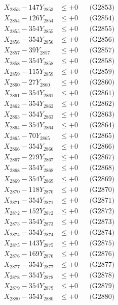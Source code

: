 \documentclass[a4paper,10pt]{article}
\begin{document}
{\begin{align}
X_{2853} - 147Y_{2853} &\leq +0 && \text{(G2853)} \\
X_{2854} - 126Y_{2854} &\leq +0 && \text{(G2854)} \\
X_{2855} - 354Y_{2855} &\leq +0 && \text{(G2855)} \\
X_{2856} - 354Y_{2856} &\leq +0 && \text{(G2856)} \\
X_{2857} - 39Y_{2857} &\leq +0 && \text{(G2857)} \\
X_{2858} - 354Y_{2858} &\leq +0 && \text{(G2858)} \\
X_{2859} - 115Y_{2859} &\leq +0 && \text{(G2859)} \\
X_{2860} - 27Y_{2860} &\leq +0 && \text{(G2860)} \\
\allowbreak
X_{2861} - 354Y_{2861} &\leq +0 && \text{(G2861)} \\
X_{2862} - 354Y_{2862} &\leq +0 && \text{(G2862)} \\
X_{2863} - 354Y_{2863} &\leq +0 && \text{(G2863)} \\
X_{2864} - 354Y_{2864} &\leq +0 && \text{(G2864)} \\
X_{2865} - 70Y_{2865} &\leq +0 && \text{(G2865)} \\
X_{2866} - 354Y_{2866} &\leq +0 && \text{(G2866)} \\
X_{2867} - 279Y_{2867} &\leq +0 && \text{(G2867)} \\
X_{2868} - 354Y_{2868} &\leq +0 && \text{(G2868)} \\
X_{2869} - 354Y_{2869} &\leq +0 && \text{(G2869)} \\
X_{2870} - 118Y_{2870} &\leq +0 && \text{(G2870)} \\
\allowbreak
X_{2871} - 354Y_{2871} &\leq +0 && \text{(G2871)} \\
X_{2872} - 152Y_{2872} &\leq +0 && \text{(G2872)} \\
X_{2873} - 354Y_{2873} &\leq +0 && \text{(G2873)} \\
X_{2874} - 354Y_{2874} &\leq +0 && \text{(G2874)} \\
X_{2875} - 143Y_{2875} &\leq +0 && \text{(G2875)} \\
X_{2876} - 169Y_{2876} &\leq +0 && \text{(G2876)} \\
X_{2877} - 354Y_{2877} &\leq +0 && \text{(G2877)} \\
X_{2878} - 354Y_{2878} &\leq +0 && \text{(G2878)} \\
X_{2879} - 354Y_{2879} &\leq +0 && \text{(G2879)} \\
X_{2880} - 354Y_{2880} &\leq +0 && \text{(G2880)} \\

\end{align}}
\end{document}
